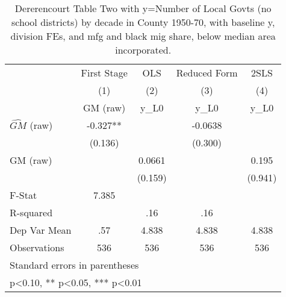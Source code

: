 \begin{table}[htbp]\centering
\def\sym#1{\ifmmode^{#1}\else\(^{#1}\)\fi}
\caption{Dererencourt Table Two with y=Number of Local Govts (no school districts) by decade in County 1950-70, with baseline y, division FEs, and mfg and black mig share, below median area incorporated.}
\begin{tabular}{l*{4}{c}}
\toprule
                    & First Stage   &         OLS   &Reduced Form   &        2SLS   \\
                    &\multicolumn{1}{c}{(1)}&\multicolumn{1}{c}{(2)}&\multicolumn{1}{c}{(3)}&\multicolumn{1}{c}{(4)}\\
                    &\multicolumn{1}{c}{GM  (raw)}&\multicolumn{1}{c}{y\_L0}&\multicolumn{1}{c}{y\_L0}&\multicolumn{1}{c}{y\_L0}\\
\midrule
$\hat{GM}$ (raw)    &      -0.327** &               &     -0.0638   &               \\
                    &     (0.136)   &               &     (0.300)   &               \\
\addlinespace
GM  (raw)           &               &      0.0661   &               &       0.195   \\
                    &               &     (0.159)   &               &     (0.941)   \\
\midrule
F-Stat              &       7.385   &               &               &               \\
R-squared           &               &         .16   &         .16   &               \\
Dep Var Mean        &         .57   &       4.838   &       4.838   &       4.838   \\
Observations        &         536   &         536   &         536   &         536   \\
\bottomrule
\multicolumn{5}{l}{\footnotesize Standard errors in parentheses}\\
\multicolumn{5}{l}{\footnotesize * p<0.10, ** p<0.05, *** p<0.01}\\
\end{tabular}
\end{table}
